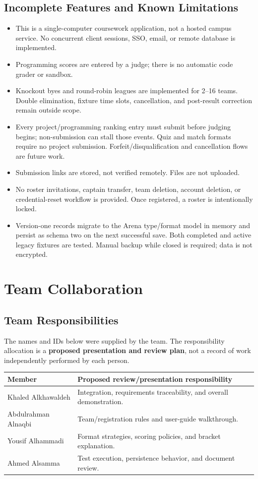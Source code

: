 \documentclass[12pt]{article}
\begin{document}
\subsection{Incomplete Features and Known Limitations}
\begin{itemize}
\item This is a single-computer coursework application, not a hosted campus service. No concurrent client sessions, SSO, email, or remote database is implemented.
\item Programming scores are entered by a judge; there is no automatic code grader or sandbox.
\item Knockout byes and round-robin leagues are implemented for 2--16 teams. Double elimination, fixture time slots, cancellation, and post-result correction remain outside scope.
\item Every project/programming ranking entry must submit before judging begins; non-submission can stall those events. Quiz and match formats require no project submission. Forfeit/disqualification and cancellation flows are future work.
\item Submission links are stored, not verified remotely. Files are not uploaded.
\item No roster invitations, captain transfer, team deletion, account deletion, or credential-reset workflow is provided. Once registered, a roster is intentionally locked.
\item Version-one records migrate to the Arena type/format model in memory and persist as schema two on the next successful save. Both completed and active legacy fixtures are tested. Manual backup while closed is required; data is not encrypted.
\end{itemize}

\section{Team Collaboration}
\subsection{Team Responsibilities}
The names and IDs below were supplied by the team. The responsibility allocation is a \textbf{proposed presentation and review plan}, not a record of work independently performed by each person.

\begin{tabularx}{\linewidth}{lY}\toprule Member & Proposed review/presentation responsibility\\\midrule
Khaled Alkhawaldeh & Integration, requirements traceability, and overall demonstration.\\
Abdulrahman Alnaqbi & Team/registration rules and user-guide walkthrough.\\
Yousif Alhammadi & Format strategies, scoring policies, and bracket explanation.\\
Ahmed Alsamma & Test execution, persistence behavior, and document review.\\\bottomrule\end{tabularx}
\end{document}
